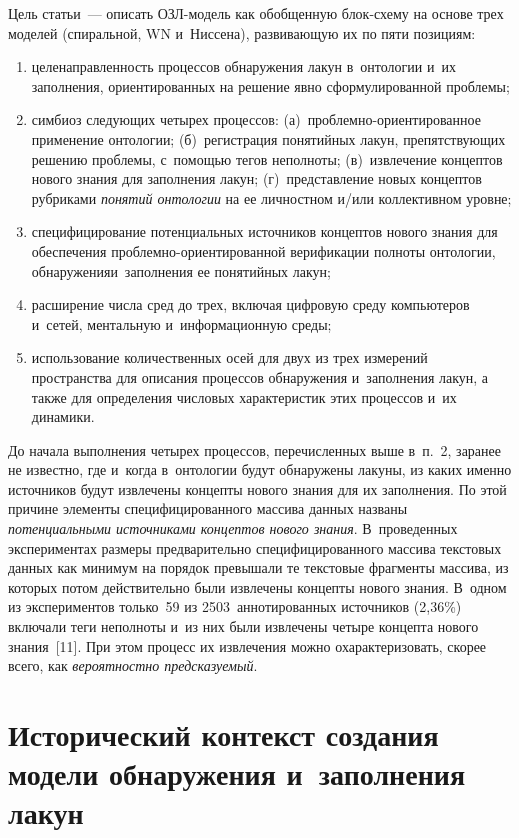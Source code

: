 {\begin{multicols}{2}
  Цель статьи~--- описать ОЗЛ-мо\-дель как обобщенную блок-схе\-му на 
основе трех моделей (спиральной, WN и~Ниссена), развивающую их по пяти 
позициям:
  \begin{enumerate}[(1)]
\item целенаправленность процессов обнаружения лакун в~онтологии и~их 
заполнения, ориентированных на решение явно сформулированной 
проблемы;
\item симбиоз следующих четырех процессов: 
(а)~проб\-лем\-но-ори\-ен\-ти\-ро\-ван\-ное применение онтологии; 
(б)~регистрация понятийных лакун, препятствующих решению проблемы, 
с~по\-мощью тегов неполноты; (в)~извлечение концептов нового знания для 
заполнения лакун; (г)~представление новых концептов руб\-ри\-ка\-ми 
\textit{понятий онтологии} на ее личностном и/или коллективном уровне;
\item специфицирование потенциальных источников концептов нового 
знания для обеспечения проб\-лем\-но-ори\-ен\-ти\-ро\-ван\-ной ве\-ри\-фи\-кации 
полноты онтологии, обнаружения\linebreak и~заполнения ее понятийных лакун;
\item расширение числа сред до трех, включая циф\-ро\-вую среду компьютеров 
и~сетей, ментальную и~информационную среды;
\item использование количественных осей для двух из трех измерений 
пространства для описания процессов обнаружения и~заполнения лакун, а 
также для определения числовых характеристик этих процессов и~их 
динамики.
  \end{enumerate}
  
  До начала выполнения четырех процессов, перечисленных выше в~п.~2, 
заранее не известно, где и~когда в~онтологии будут обнаружены лакуны, из 
каких именно источников будут извлечены концепты нового знания для их 
заполнения. По этой причине элементы специфицированного массива данных 
названы \textit{потенциальными источниками концептов нового знания}. 
В~проведенных экспериментах размеры предварительно специфицированного массива 
текстовых данных как минимум на порядок превышали те текстовые 
фрагменты массива, из которых потом действительно были  извлечены концепты нового знания. В~одном 
из экспериментов только~59 из 2503~аннотированных источников (2,36\%) 
включали теги неполноты и~из них были извлечены четыре концепта нового 
знания~[11]. При этом процесс их извлечения можно охарактеризовать, скорее 
всего, как \textit{вероятностно предсказуемый}.
  
\section{Исторический контекст создания модели обнаружения и~заполнения лакун}
  

\end{multicols}}

